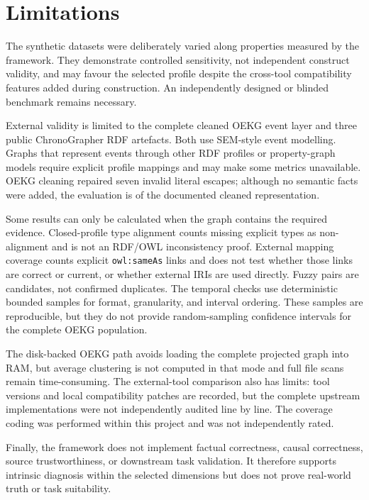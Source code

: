 \section{Limitations}

The synthetic datasets were deliberately varied along properties measured by the framework. They demonstrate controlled sensitivity, not independent construct validity, and may favour the selected profile despite the cross-tool compatibility features added during construction. An independently designed or blinded benchmark remains necessary.

External validity is limited to the complete cleaned OEKG event layer and three public ChronoGrapher RDF artefacts. Both use SEM-style event modelling. Graphs that represent events through other RDF profiles or property-graph models require explicit profile mappings and may make some metrics unavailable. OEKG cleaning repaired seven invalid literal escapes; although no semantic facts were added, the evaluation is of the documented cleaned representation.

Some results can only be calculated when the graph contains the required evidence. Closed-profile type alignment counts missing explicit types as non-alignment and is not an RDF/OWL inconsistency proof. External mapping coverage counts explicit \texttt{owl:sameAs} links and does not test whether those links are correct or current, or whether external IRIs are used directly. Fuzzy pairs are candidates, not confirmed duplicates. The temporal checks use deterministic bounded samples for format, granularity, and interval ordering. These samples are reproducible, but they do not provide random-sampling confidence intervals for the complete OEKG population.

The disk-backed OEKG path avoids loading the complete projected graph into RAM, but average clustering is not computed in that mode and full file scans remain time-consuming. The external-tool comparison also has limits: tool versions and local compatibility patches are recorded, but the complete upstream implementations were not independently audited line by line. The coverage coding was performed within this project and was not independently rated.

Finally, the framework does not implement factual correctness, causal correctness, source trustworthiness, or downstream task validation. It therefore supports intrinsic diagnosis within the selected dimensions but does not prove real-world truth or task suitability.
